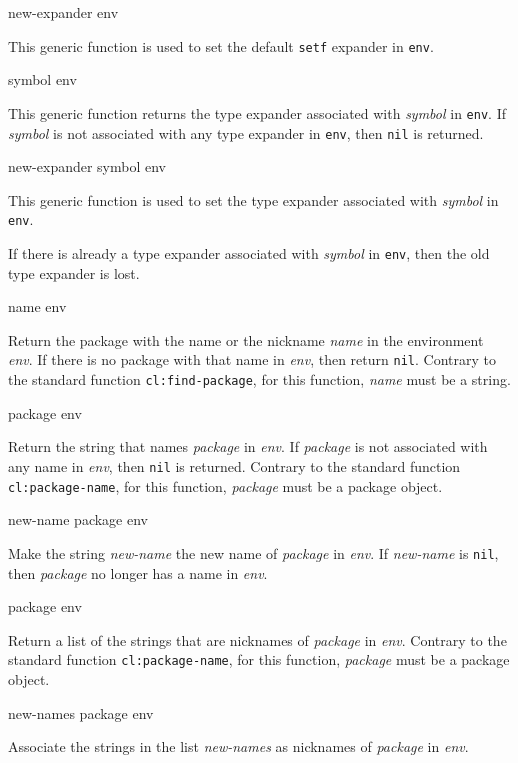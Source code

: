  {new-expander env}

This generic function is used to set the default \texttt{setf}
expander in \texttt{env}.

 {symbol env}

This generic function returns the type expander associated with
\textit{symbol} in \texttt{env}.  If \textit{symbol} is not associated
with any type expander in \texttt{env}, then \texttt{nil} is returned.

 {new-expander symbol env}

This generic function is used to set the type expander associated
with \textit{symbol} in \texttt{env}.

If there is already a type expander associated with \textit{symbol} in
\texttt{env}, then the old type expander is lost.

 {name env}

Return the package with the name or the nickname \textit{name} in the
environment \textit{env}.  If there is no package with that name
in \textit{env}, then return \texttt{nil}.  Contrary to
the standard \commonlisp{} function \texttt{cl:find-package}, for this
function, \textit{name} must be a string.

 {package env}

Return the string that names \textit{package} in \textit{env}.
If \textit{package} is not associated with any name in \textit{env},
then \texttt{nil} is returned.  Contrary to the standard \commonlisp{}
function \texttt{cl:package-name}, for this function, \textit{package}
must be a package object.

 {new-name package env}

Make the string \textit{new-name} the new name of \textit{package}
in \textit{env}.  If \textit{new-name} is \texttt{nil},
then \textit{package} no longer has a name in \textit{env}.

 {package env}

Return a list of the strings that are nicknames of \textit{package}
in \textit{env}.  Contrary to the standard \commonlisp{}
function \texttt{cl:package-name}, for this function, \textit{package}
must be a package object.

 {new-names package env}

Associate the strings in the list \textit{new-names} as nicknames
of \textit{package} in \textit{env}.
